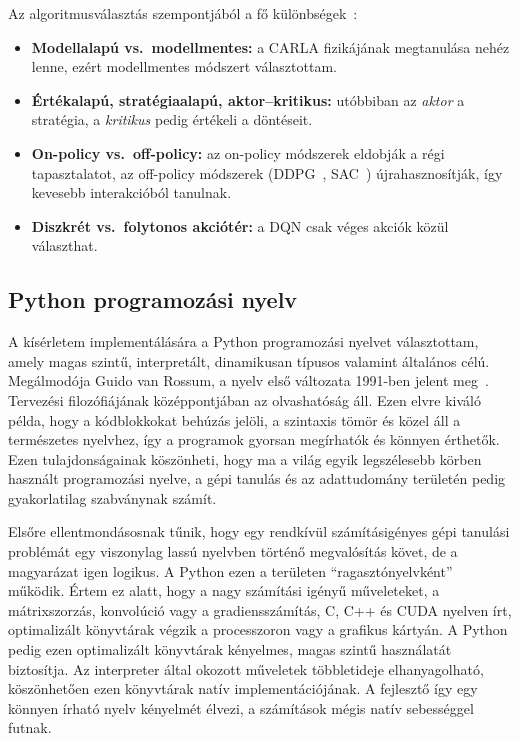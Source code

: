\documentclass[a4paper,12pt,oneside]{article}
\begin{document}
Az algoritmusválasztás szempontjából a fő különbségek~\cite{sutton2018rl}:
\begin{itemize}
  \item \textbf{Modellalapú vs.\ modellmentes:} a CARLA fizikájának
  megtanulása nehéz lenne, ezért modellmentes módszert választottam.
  \item \textbf{Értékalapú, stratégiaalapú, aktor--kritikus:} utóbbiban az
  \emph{aktor} a stratégia, a \emph{kritikus} pedig értékeli a döntéseit.
  \item \textbf{On-policy vs.\ off-policy:} az on-policy módszerek eldobják a régi tapasztalatot, az off-policy
  módszerek (DDPG~\cite{lillicrap2016ddpg}, SAC~\cite{haarnoja2018sac}) újrahasznosítják, 
  így kevesebb interakcióból
  tanulnak.
  \item \textbf{Diszkrét vs.\ folytonos akciótér:} a DQN csak véges akciók
  közül választhat.
\end{itemize}


\subsection{Python programozási nyelv}
\label{sec:python}

A kísérletem implementálására a Python programozási nyelvet választottam, amely magas szintű,  
interpretált, dinamikusan típusos valamint általános célú.
Megálmodója Guido van Rossum, a nyelv első változata 1991-ben jelent meg~\cite{pythonweb}. 
Tervezési filozófiájának középpontjában az olvashatóság áll. Ezen elvre kiváló példa, hogy a kódblokkokat behúzás jelöli, a szintaxis
tömör és közel áll a természetes nyelvhez, így a programok gyorsan megírhatók
és könnyen érthetők. Ezen tulajdonságainak köszönheti, hogy ma a világ egyik legszélesebb körben használt programozási
nyelve, a gépi tanulás és az adattudomány területén pedig gyakorlatilag
szabványnak számít.

Elsőre ellentmondásosnak tűnik, hogy egy rendkívül számításigényes gépi tanulási problémát 
egy viszonylag lassú nyelvben történő megvalósítás követ, de a magyarázat igen logikus. A Python
ezen a területen \enquote{ragasztónyelvként} működik. Értem ez alatt, hogy a nagy számítási igényű
műveleteket, a mátrixszorzás, konvolúció vagy a gradiensszámítás, C,
C++ és CUDA nyelven írt, optimalizált könyvtárak végzik a processzoron vagy a
grafikus kártyán. A Python pedig ezen optimalizált könyvtárak kényelmes, magas szintű használatát biztosítja. 
Az interpreter által okozott műveletek többletideje elhanyagolható, köszönhetően ezen könyvtárak natív implementációjának. A
fejlesztő így egy könnyen írható nyelv kényelmét élvezi, a számítások mégis natív sebességgel futnak.
\end{document}
